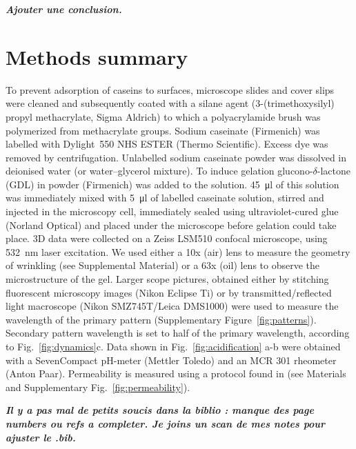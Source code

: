 \documentclass[twocolumn,superscriptaddress,showpacs,preprintnumbers,
amsmath,amssymb,prl]{revtex4-1}
\newcommand{\seb}[1]{\textbf{\color{blue}#1}} %
\begin{document}
\seb{\it Ajouter une conclusion.}

\section*{Methods summary}
To prevent adsorption of caseins to surfaces, microscope slides and cover slips were cleaned and subsequently coated with a silane agent (3-(trimethoxysilyl) propyl methacrylate, Sigma Aldrich) to which a polyacrylamide brush was polymerized from methacrylate groups.
Sodium caseinate (Firmenich) was labelled with Dylight~550 NHS ESTER (Thermo Scientific). Excess dye was removed by centrifugation. Unlabelled sodium caseinate powder was dissolved in deionised water (or water--glycerol mixture). To induce gelation glucono-$\delta$-lactone (GDL) in powder (Firmenich) was added to the solution. \SI{45}{\micro\litre} of this solution was immediately mixed with \SI{5}{\micro\litre} of labelled caseinate solution, stirred and injected in the microscopy cell, immediately sealed using ultraviolet-cured glue (Norland Optical) and placed under the microscope before gelation could take place. 
3D data were collected on a Zeiss LSM510 confocal microscope, using \SI{532}{\nano\meter} laser excitation. We used either a 10x (air) lens to measure the geometry of wrinkling (see Supplemental Material) or a 63x (oil) lens to observe the microstructure of the gel. Larger scope pictures, obtained either by stitching fluorescent microscopy images (Nikon Eclipse Ti) or by transmitted/reflected light macroscope (Nikon SMZ745T/Leica DMS1000) were used to measure the wavelength of the primary pattern (Supplementary Figure~\ref{fig:patterns}). Secondary pattern wavelength is set to half of the primary wavelength, according to Fig.~\ref{fig:dynamics}c.
Data shown in Fig.~\ref{fig:acidification} a-b were obtained with a SevenCompact pH-meter (Mettler Toledo) and an MCR 301 rheometer (Anton Paar).
Permeability is measured using a protocol found in \cite{VanDijk1986} (see Materials and Supplementary Fig.~\ref{fig:permeability}).

\seb{\it Il y a pas mal de petits soucis dans la biblio : manque des page numbers ou refs a completer. Je joins un scan de mes notes pour ajuster le .bib.}



\end{document}
